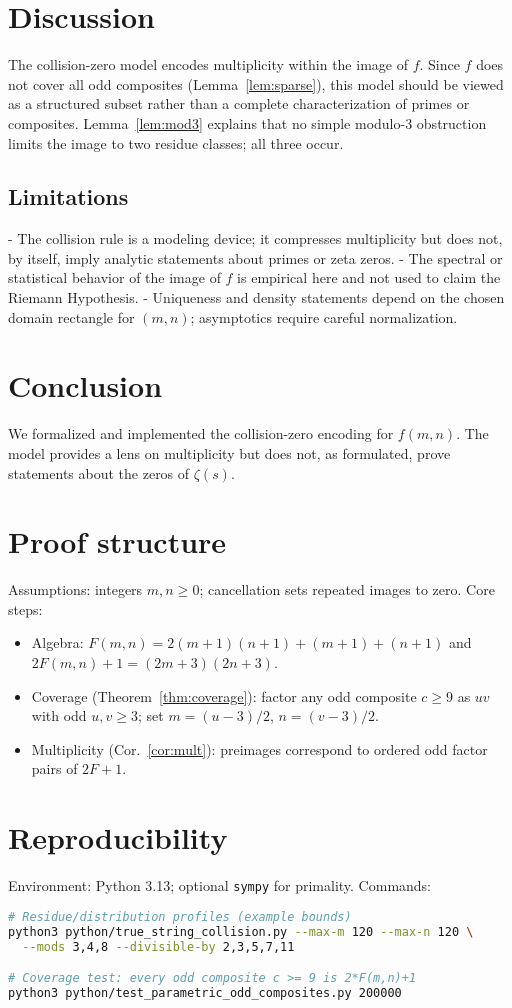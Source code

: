\documentclass[12pt,a4paper]{article}
\begin{document}
\section{Discussion}
The collision-zero model encodes multiplicity within the image of \(f\). Since \(f\) does not cover all odd composites (Lemma~\ref{lem:sparse}), this model should be viewed as a structured subset rather than a complete characterization of primes or composites. Lemma~\ref{lem:mod3} explains that no simple modulo-3 obstruction limits the image to two residue classes; all three occur.

\subsection*{Limitations}
- The collision rule is a modeling device; it compresses multiplicity but does not, by itself, imply analytic statements about primes or zeta zeros.
- The spectral or statistical behavior of the image of \(f\) is empirical here and not used to claim the Riemann Hypothesis.
- Uniqueness and density statements depend on the chosen domain rectangle for \((m,n)\); asymptotics require careful normalization.

\section{Conclusion}
We formalized and implemented the collision-zero encoding for \(f(m,n)\). The model provides a lens on multiplicity but does not, as formulated, prove statements about the zeros of \(\zeta(s)\).

\appendix
\section{Proof structure}
Assumptions: integers \(m,n\ge 0\); cancellation sets repeated images to zero. Core steps:
\begin{itemize}
  \item Algebra: \(F(m,n)=2(m{+}1)(n{+}1)+(m{+}1)+(n{+}1)\) and \(2F(m,n)+1=(2m{+}3)(2n{+}3)\).
  \item Coverage (Theorem~\ref{thm:coverage}): factor any odd composite \(c\ge 9\) as \(uv\) with odd \(u,v\ge 3\); set \(m=(u{-}3)/2\), \(n=(v{-}3)/2\).
  \item Multiplicity (Cor.~\ref{cor:mult}): preimages correspond to ordered odd factor pairs of \(2F{+}1\).
\end{itemize}

\section{Reproducibility}
Environment: Python 3.13; optional \texttt{sympy} for primality. Commands:
\begin{lstlisting}[language=bash]
# Residue/distribution profiles (example bounds)
python3 python/true_string_collision.py --max-m 120 --max-n 120 \
  --mods 3,4,8 --divisible-by 2,3,5,7,11

# Coverage test: every odd composite c >= 9 is 2*F(m,n)+1
python3 python/test_parametric_odd_composites.py 200000
\end{lstlisting}



\end{document}
